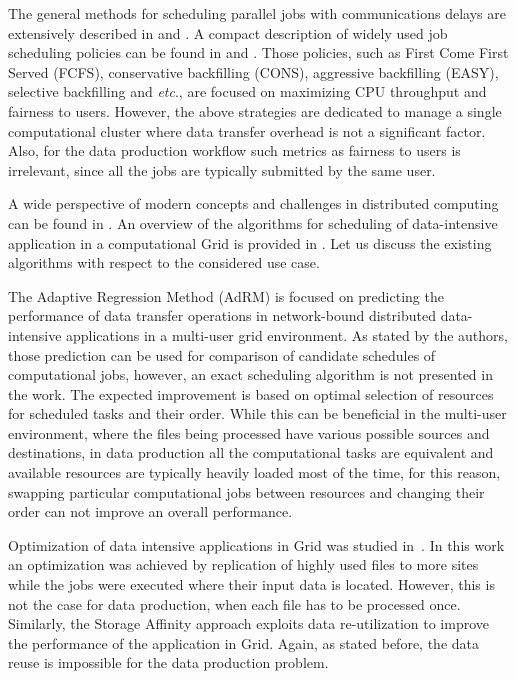 \documentclass{svjour3}                     %
\begin{document}
The general methods for scheduling parallel jobs with communications delays are extensively described in  \cite{bookDrozdovski} and \cite{sinnen2007task}. A compact description of widely used job scheduling policies can be found in \cite{Klusacek} and \cite{srinivasan2002selective}. Those policies, such as First Come First Served (FCFS), conservative backfilling (CONS), aggressive backfilling (EASY), selective backfilling and \textit{etc}., are focused on maximizing CPU throughput and fairness to users.  However, the above strategies are dedicated to manage a single computational cluster where data transfer overhead is not a significant factor. Also, for the data production workflow such metrics as fairness to users is irrelevant, since all the jobs are typically submitted by the same user.

A wide perspective of modern concepts and challenges in distributed computing can be found in \cite{hwang2013distributed}. An overview of the algorithms for scheduling of data-intensive application in a computational Grid is provided in \cite{Magoules}.  %
Let us discuss the existing algorithms with respect to the considered use case.

%

The Adaptive Regression Method (AdRM) \cite{AdRM} is focused on predicting the performance of data transfer operations in network-bound distributed data-intensive applications in a multi-user grid environment. As stated by the authors, those prediction can be used for comparison of candidate schedules of computational jobs, however, an exact scheduling algorithm is not presented in the work. The expected improvement is based on optimal selection of resources for scheduled tasks and their order. While this can be beneficial in the multi-user environment, where the files being processed have various possible sources and destinations, in data production all the computational tasks are equivalent  and  available resources are typically heavily loaded most of the time, for this reason, swapping particular computational jobs between resources and changing their order can not improve an overall performance.

Optimization of data intensive applications in Grid was studied
in~\cite{Globus_scheduler}. In this work an optimization was achieved by
replication of highly used files to more sites while the jobs were executed
where their input data is located. However, this is not the case for data
production, when each file has to be processed once. Similarly, the Storage Affinity  \cite{StorageAffinity} approach exploits data re-utilization to improve the performance of the application in Grid. Again, as stated before, the data reuse is impossible for the data production problem.
\end{document}
